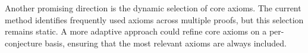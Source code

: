 \documentclass[english,version-2020-11]{uzl-thesis}
\begin{document}
Another promising direction is the dynamic selection of core axioms. The current method identifies frequently used axioms across multiple proofs, but this selection remains static. A more adaptive approach could refine core axioms on a per-conjecture basis, ensuring that the most relevant axioms are always included.



%

% 
%
%
%
% 
% 
%
%
%
%
% 
% 
%
%
%
%
% 
%
%
\end{document}
